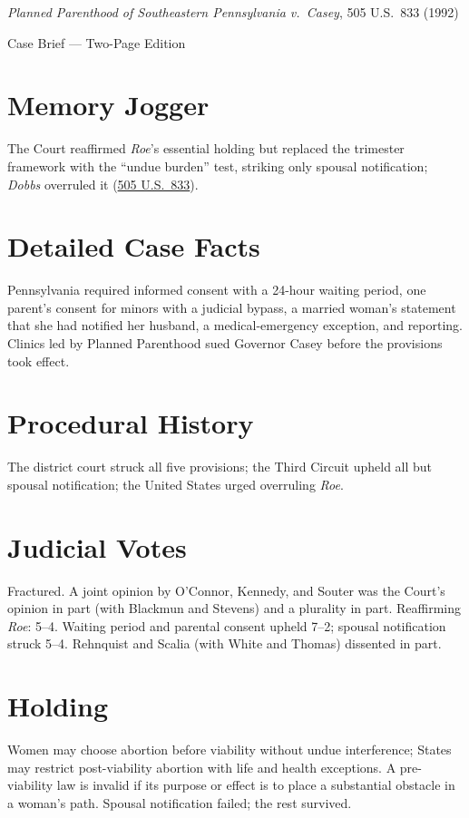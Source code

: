 \documentclass[12pt]{article}
\begin{document}
\begin{center}
{\LARGE \textit{Planned Parenthood of Southeastern Pennsylvania v.\ Casey}, 505 U.S.\ 833 (1992)\par}
\vspace{0.5em}
{\large Case Brief --- Two-Page Edition\par}
\end{center}

\section{Memory Jogger}
The Court reaffirmed \textit{Roe}'s essential holding but replaced the trimester framework with the ``undue burden'' test, striking only spousal notification; \textit{Dobbs} overruled it (\href{https://supreme.justia.com/cases/federal/us/505/833/}{505 U.S.\ 833}).

\section{Detailed Case Facts}
Pennsylvania required informed consent with a 24-hour waiting period, one parent's consent for minors with a judicial bypass, a married woman's statement that she had notified her husband, a medical-emergency exception, and reporting. Clinics led by Planned Parenthood sued Governor Casey before the provisions took effect.

\section{Procedural History}
The district court struck all five provisions; the Third Circuit upheld all but spousal notification; the United States urged overruling \textit{Roe}.

\section{Judicial Votes}
Fractured. A joint opinion by O'Connor, Kennedy, and Souter was the Court's opinion in part (with Blackmun and Stevens) and a plurality in part. Reaffirming \textit{Roe}: 5--4. Waiting period and parental consent upheld 7--2; spousal notification struck 5--4. Rehnquist and Scalia (with White and Thomas) dissented in part.

\section{Holding}
Women may choose abortion before viability without undue interference; States may restrict post-viability abortion with life and health exceptions. A pre-viability law is invalid if its purpose or effect is to place a substantial obstacle in a woman's path. Spousal notification failed; the rest survived.
\end{document}
